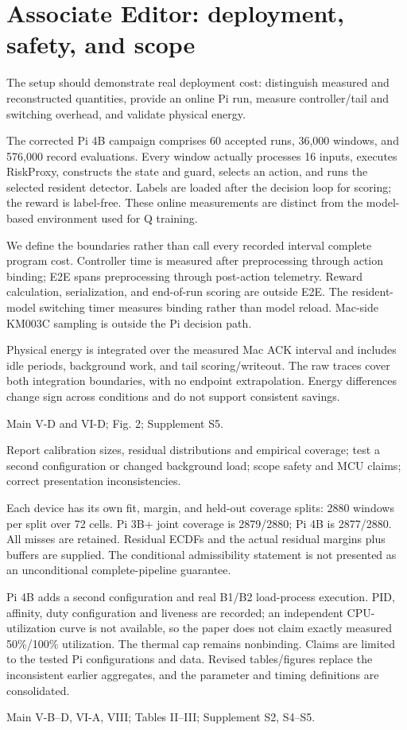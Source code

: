 \documentclass[10pt,a4paper]{article}
\newcommand{\commentbox}[1]{\begin{rcommentbox}#1\end{rcommentbox}}
\newcommand{\responsebox}[1]{\begin{authorresponsebox}#1\end{authorresponsebox}}
\newcommand{\changebox}[1]{\begin{wherebox}#1\end{wherebox}}
\begin{document}
\clearpage
\section*{Associate Editor: deployment, safety, and scope}
\commentbox{The setup should demonstrate real deployment cost: distinguish measured and reconstructed quantities, provide an online Pi run, measure controller/tail and switching overhead, and validate physical energy.}
\responsebox{The corrected Pi 4B campaign comprises 60 accepted runs, 36,000 windows, and 576,000 record evaluations. Every window actually processes 16 inputs, executes RiskProxy, constructs the state and guard, selects an action, and runs the selected resident detector. Labels are loaded after the decision loop for scoring; the reward is label-free. These online measurements are distinct from the model-based environment used for Q training.

We define the boundaries rather than call every recorded interval complete program cost. Controller time is measured after preprocessing through action binding; E2E spans preprocessing through post-action telemetry. Reward calculation, serialization, and end-of-run scoring are outside E2E. The resident-model switching timer measures binding rather than model reload. Mac-side KM003C sampling is outside the Pi decision path.

Physical energy is integrated over the measured Mac ACK interval and includes idle periods, background work, and tail scoring/writeout. The raw traces cover both integration boundaries, with no endpoint extrapolation. Energy differences change sign across conditions and do not support consistent savings.}
\changebox{Main V-D and VI-D; Fig. 2; Supplement S5.}
\commentbox{Report calibration sizes, residual distributions and empirical coverage; test a second configuration or changed background load; scope safety and MCU claims; correct presentation inconsistencies.}
\responsebox{Each device has its own fit, margin, and held-out coverage splits: 2880 windows per split over 72 cells. Pi 3B+ joint coverage is 2879/2880; Pi 4B is 2877/2880. All misses are retained. Residual ECDFs and the actual residual margins plus buffers are supplied. The conditional admissibility statement is not presented as an unconditional complete-pipeline guarantee.

Pi 4B adds a second configuration and real B1/B2 load-process execution. PID, affinity, duty configuration and liveness are recorded; an independent CPU-utilization curve is not available, so the paper does not claim exactly measured 50\%/100\% utilization. The thermal cap remains nonbinding. Claims are limited to the tested Pi configurations and data. Revised tables/figures replace the inconsistent earlier aggregates, and the parameter and timing definitions are consolidated.}
\changebox{Main V-B--D, VI-A, VIII; Tables II--III; Supplement S2, S4--S5.}
\end{document}
